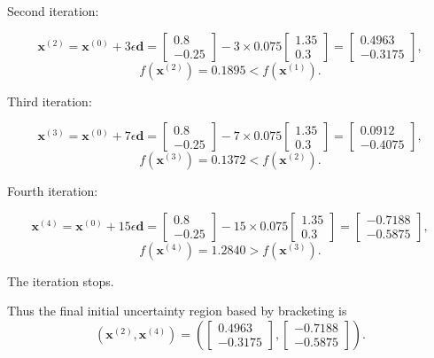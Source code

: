Second iteration:

\[\boldsymbol{x}^{(2)}=\boldsymbol{x}^{(0)}+3 \epsilon \boldsymbol{d}=\left[\begin{array}{c}0.8 \\ -0.25\end{array}\right]-3 \times 0.075\left[\begin{array}{c}1.35 \\ 0.3\end{array}\right]=\left[\begin{array}{c}0.4963 \\ -0.3175\end{array}\right],\] \[f\left(\boldsymbol{x}^{(2)}\right)=0.1895<f\left(\boldsymbol{x}^{(1)}\right).\]

Third iteration:

\[\boldsymbol{x}^{(3)}=\boldsymbol{x}^{(0)}+7 \epsilon \boldsymbol{d}=\left[\begin{array}{c}0.8 \\ -0.25\end{array}\right]-7 \times 0.075\left[\begin{array}{c}1.35 \\ 0.3\end{array}\right]=\left[\begin{array}{c}0.0912 \\ -0.4075\end{array}\right],\] \[f\left(\boldsymbol{x}^{(3)}\right)=0.1372<f\left(\boldsymbol{x}^{(2)}\right).\]

Fourth iteration:

\[\boldsymbol{x}^{(4)}=\boldsymbol{x}^{(0)}+15 \epsilon \boldsymbol{d}=\left[\begin{array}{c}0.8 \\ -0.25\end{array}\right]-15 \times 0.075\left[\begin{array}{c}1.35 \\ 0.3\end{array}\right]=\left[\begin{array}{c}-0.7188 \\ -0.5875\end{array}\right],\] \[f\left(\boldsymbol{x}^{(4)}\right)=1.2840>f\left(\boldsymbol{x}^{(3)}\right).\]

The iteration stops.

Thus the final initial uncertainty region based by bracketing is \[\left(\boldsymbol{x}^{(2)}, \boldsymbol{x}^{(4)}\right)=\left(\left[\begin{array}{c}0.4963 \\ -0.3175\end{array}\right],\left[\begin{array}{c}-0.7188 \\ -0.5875\end{array}\right]\right).\]

